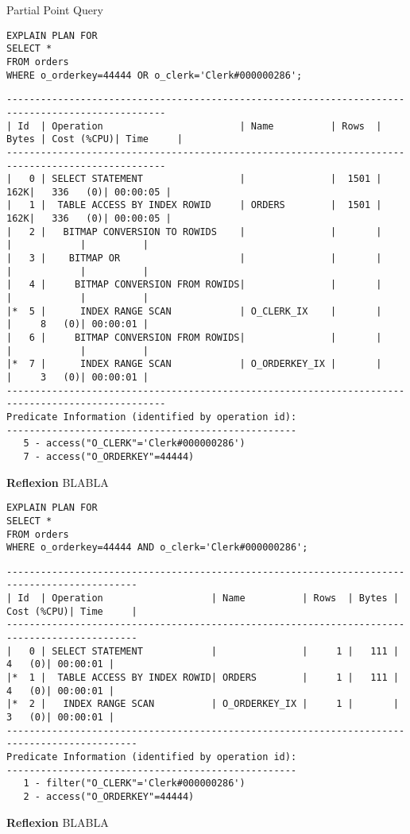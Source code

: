 \documentclass[10pt]{article}
\begin{document}
Partial Point Query
\begin{lstlisting}[style=sql]
EXPLAIN PLAN FOR
SELECT *
FROM orders
WHERE o_orderkey=44444 OR o_clerk='Clerk#000000286';
\end{lstlisting}
\begin{lstlisting}[style=queryexecutionplan]
--------------------------------------------------------------------------------------------------
| Id  | Operation                        | Name          | Rows  | Bytes | Cost (%CPU)| Time     |
--------------------------------------------------------------------------------------------------
|   0 | SELECT STATEMENT                 |               |  1501 |   162K|   336   (0)| 00:00:05 |
|   1 |  TABLE ACCESS BY INDEX ROWID     | ORDERS        |  1501 |   162K|   336   (0)| 00:00:05 |
|   2 |   BITMAP CONVERSION TO ROWIDS    |               |       |       |            |          |
|   3 |    BITMAP OR                     |               |       |       |            |          |
|   4 |     BITMAP CONVERSION FROM ROWIDS|               |       |       |            |          |
|*  5 |      INDEX RANGE SCAN            | O_CLERK_IX    |       |       |     8   (0)| 00:00:01 |
|   6 |     BITMAP CONVERSION FROM ROWIDS|               |       |       |            |          |
|*  7 |      INDEX RANGE SCAN            | O_ORDERKEY_IX |       |       |     3   (0)| 00:00:01 |
--------------------------------------------------------------------------------------------------
Predicate Information (identified by operation id):
---------------------------------------------------
   5 - access("O_CLERK"='Clerk#000000286')
   7 - access("O_ORDERKEY"=44444)
\end{lstlisting}
\textbf{Reflexion} \newline
BLABLA

\begin{lstlisting}[style=sql]
EXPLAIN PLAN FOR
SELECT *
FROM orders
WHERE o_orderkey=44444 AND o_clerk='Clerk#000000286';
\end{lstlisting}
\begin{lstlisting}[style=queryexecutionplan]
---------------------------------------------------------------------------------------------
| Id  | Operation                   | Name          | Rows  | Bytes | Cost (%CPU)| Time     |
---------------------------------------------------------------------------------------------
|   0 | SELECT STATEMENT            |               |     1 |   111 |     4   (0)| 00:00:01 |
|*  1 |  TABLE ACCESS BY INDEX ROWID| ORDERS        |     1 |   111 |     4   (0)| 00:00:01 |
|*  2 |   INDEX RANGE SCAN          | O_ORDERKEY_IX |     1 |       |     3   (0)| 00:00:01 |
---------------------------------------------------------------------------------------------
Predicate Information (identified by operation id):
---------------------------------------------------
   1 - filter("O_CLERK"='Clerk#000000286')
   2 - access("O_ORDERKEY"=44444)
\end{lstlisting}
\textbf{Reflexion} \newline
BLABLA
\end{document}
